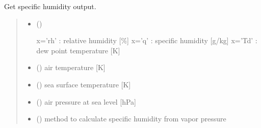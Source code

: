 \documentclass[letterpaper,10pt,english]{sphinxmanual}
\begin{document}
\begin{fulllineitems}
\label{\detokenize{users_guide:AirSeaFluxCode.hum_subs.get_hum}}
\pysigstartsignatures
\pysiglinewithargsret
{}
{\sphinxparamcomma {}\sphinxparamcomma {}\sphinxparamcomma {}\sphinxparamcomma {}}
{}
\pysigstopsignatures
\sphinxAtStartPar
Get specific humidity output.
\begin{quote}\begin{description}
\begin{itemize}
\item {}
\sphinxAtStartPar
{} () \textendash{} \begin{description}
\sphinxAtStartPar
x=’rh’ : relative humidity {[}\%{]}
x=’q’ : specific humidity {[}g/kg{]}
x=’Td’ : dew point temperature {[}K{]}

\end{description}


\item {}
\sphinxAtStartPar
{} () \textendash{} air temperature {[}K{]}

\item {}
\sphinxAtStartPar
{} () \textendash{} sea surface temperature {[}K{]}

\item {}
\sphinxAtStartPar
{} () \textendash{} air pressure at sea level {[}hPa{]}

\item {}
\sphinxAtStartPar
{} () \textendash{} method to calculate specific humidity from vapor pressure

\end{itemize}

\sphinxAtStartPar
{}


\end{description}
\end{quote}
\end{fulllineitems}
\end{document}
